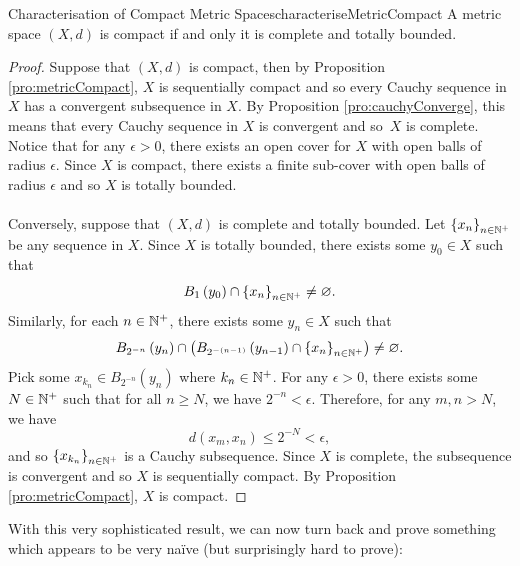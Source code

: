 \documentclass[math]{amznotes}
\theoremstyle{remark}
\begin{document}
\begin{probox}{Characterisation of Compact Metric Spaces}{characteriseMetricCompact}
    A metric space $\left(X, d\right)$ is compact if and only it is complete and totally bounded.
    \tcblower
    \begin{proof}
        Suppose that $\left(X, d\right)$ is compact, then by Proposition \ref{pro:metricCompact}, $X$ is sequentially compact and so every Cauchy sequence in $X$ has a convergent subsequence in $X$. By Proposition \ref{pro:cauchyConverge}, this means that every Cauchy sequence in $X$ is convergent and so~$X$ is complete. Notice that for any $\epsilon > 0$, there exists an open cover for $X$ with open balls of radius $\epsilon$. Since $X$ is compact, there exists a finite sub-cover with open balls of radius $\epsilon$ and so $X$ is totally bounded.
        \\\\
        Conversely, suppose that $\left(X, d\right)$ is complete and totally bounded. Let $\left\{x_n\right\}_{n \in \mathbb{N}^+}$ be any sequence in $X$. Since $X$ is totally bounded, there exists some $y_0 \in X$ such that 
        \begin{equation*}
            B_1\left(y_0\right) \cap \left\{x_n\right\}_{n \in \mathbb{N}^+} \neq \varnothing.
        \end{equation*}
        Similarly, for each $n \in \mathbb{N}^+$, there exists some $y_n \in X$ such that 
        \begin{equation*}
            B_{2^{-n}}\left(y_n\right) \cap \left(B_{2^{-\left(n - 1\right)}}\left(y_{n - 1}\right) \cap \left\{x_n\right\}_{n \in \mathbb{N}^+}\right) \neq \varnothing.
        \end{equation*}
        Pick some $x_{k_n} \in B_{2^{-n}}\left(y_n\right)$ where $k_n \in \mathbb{N}^+$. For any $\epsilon > 0$, there exists some $N \in \mathbb{N}^+$ such that for all $n \geq N$, we have $2^{-n} < \epsilon$. Therefore, for any $m, n > N$, we have 
        \begin{equation*}
            d\left(x_m, x_n\right) \leq 2^{-N} < \epsilon,
        \end{equation*}
        and so $\left\{x_{k_n}\right\}_{n \in \mathbb{N}^+}$ is a Cauchy subsequence. Since $X$ is complete, the subsequence is convergent and so $X$ is sequentially compact. By Proposition \ref{pro:metricCompact}, $X$ is compact.
    \end{proof}
\end{probox}
With this very sophisticated result, we can now turn back and prove something which appears to be very na\"{i}ve (but surprisingly hard to prove):
\end{document}
